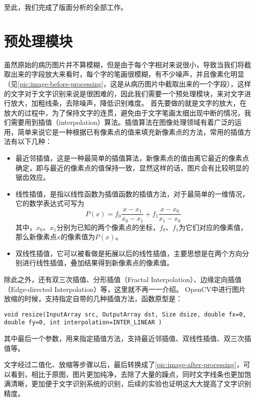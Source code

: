 至此，我们完成了版面分析的全部工作。

\section{预处理模块}     %
虽然原始的病历图片并不算模糊，但是由于每个字相对来说很小，导致当我们将截取出来的字段放大来看时，每个字的笔画很模糊，有不少噪声，并且像素化明显（见\autoref{pic:image-before-processing}，这是从病历图片中截取出来的一个字段），这样的文字对于文字识别来说是很困难的，因此我们需要一个预处理模块，来对文字进行放大，加粗线条，去除噪声，降低识别难度。
首先要做的就是文字的放大，在放大的过程中，为了保持文字的连贯，避免由于文字笔画太细出现中断的情况，我们需要用到插值（interpolation）算法。插值算法在图像处理领域有着广泛的运用\citep{thevenaz2000image}，简单来说它是一种根据已有像素点的值来填充新像素点的方法，常用的插值方法有以下几种：
\begin{itemize}
	\item 最近邻插值，这是一种最简单的插值算法，新像素点的值由离它最近的像素点确定，即与最近的像素点的值保持一致，显然这样的话，图片会有比较明显的锯齿效应。
	\item 线性插值，是指以线性函数为插值函数的插值方法，对于最简单的一维情况，它的数学表达式可写为
		\begin{equation}
			P(x) = f_0\frac{x-x_1}{x_0-x_1}+f_1\frac{x-x_0}{x_1-x_0}
		\end{equation}
		其中，$x_0$、$x_1$分别为已知的两个像素点的坐标，$f_0$、$f_1$为它们对应的像素值，那么新像素点$x$的像素值为$P(x)$。
	\item 双线性插值，它可以被看做是拓展以后的线性插值，主要思想是在两个方向分别进行线性插值，叠加结果得到新像素点的像素值。
\end{itemize}
除此之外，还有双三次插值、分形插值（Fractal Interpolation）\citep{barnsley1986fractal}、边缘定向插值（Edge-directed Interpolation）\citep{li2001new}等，这里就不再一一介绍。
OpenCV中进行图片放缩的时候，支持指定自带的几种插值方法，函数原型是：
\begin{lstlisting}
void resize(InputArray src, OutputArray dst, Size dsize, double fx=0, double fy=0, int interpolation=INTER_LINEAR )
\end{lstlisting}
其中最后一个参数，用来指定插值方法，支持最近邻插值、双线性插值、双三次插值等。

文字经过二值化、放缩等步骤以后，最后转换成了\autoref{pic:image-after-processing}，可以看到，相比于原图，图片更加纯净，去除了大量的躁点，同时文字线条也更加饱满清晰，更加便于文字识别系统的识别，后续的实验也证明这大大提高了文字识别精度。

